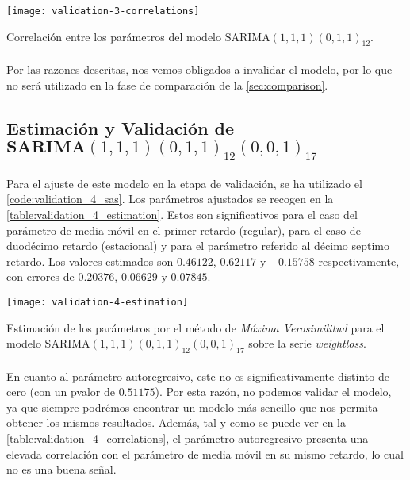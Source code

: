 \documentclass[a4paper, spanish]{article}
\begin{document}
      \begin{table}[htb!]
        \centering
        \texttt{[image: validation-3-correlations]}
        \caption{Correlación entre los parámetros del modelo $\text{SARIMA}(1, 1, 1)(0, 1, 1)_{12}$.}
        \label{table:validation_3_correlations}
      \end{table}

      \paragraph{}
      Por las razones descritas, nos vemos obligados a invalidar el modelo, por lo que no será utilizado en la fase de comparación de la \autoref{sec:comparison}.

    \subsection{Estimación y Validación de $\textbf{SARIMA}(1, 1, 1)(0, 1, 1)_{12}(0, 0, 1)_{17}$}
    \label{sec:fitting_4}

      \paragraph{}
      Para el ajuste de este modelo en la etapa de validación, se ha utilizado el \autoref{code:validation_4_sas}. Los parámetros ajustados se recogen en la \autoref{table:validation_4_estimation}. Estos son significativos para el caso del parámetro de media móvil en el primer retardo (regular), para el caso de duodécimo retardo (estacional) y para el parámetro referido al décimo septimo retardo. Los valores estimados son $0.46122$, $0.62117$ y $-0.15758$ respectivamente, con errores de $0.20376$, $0.06629$ y $0.07845$.

      \begin{table}[htb!]
        \centering
        \texttt{[image: validation-4-estimation]}
        \caption{Estimación de los parámetros por el método de \emph{Máxima Verosimilitud} para el modelo $\text{SARIMA}(1, 1, 1)(0, 1, 1)_{12}(0, 0, 1)_{17}$ sobre la serie \emph{weightloss}.}
        \label{table:validation_4_estimation}
      \end{table}

      \paragraph{}
      En cuanto al parámetro autoregresivo, este no es significativamente distinto de cero (con un pvalor de $0.51175$). Por esta razón, no podemos validar el modelo, ya que siempre podrémos encontrar un modelo más sencillo que nos permita obtener los mismos resultados. Además, tal y como se puede ver en la \autoref{table:validation_4_correlations}, el parámetro autoregresivo presenta una elevada correlación con el parámetro de media móvil en su mismo retardo, lo cual no es una buena señal.
\end{document}
